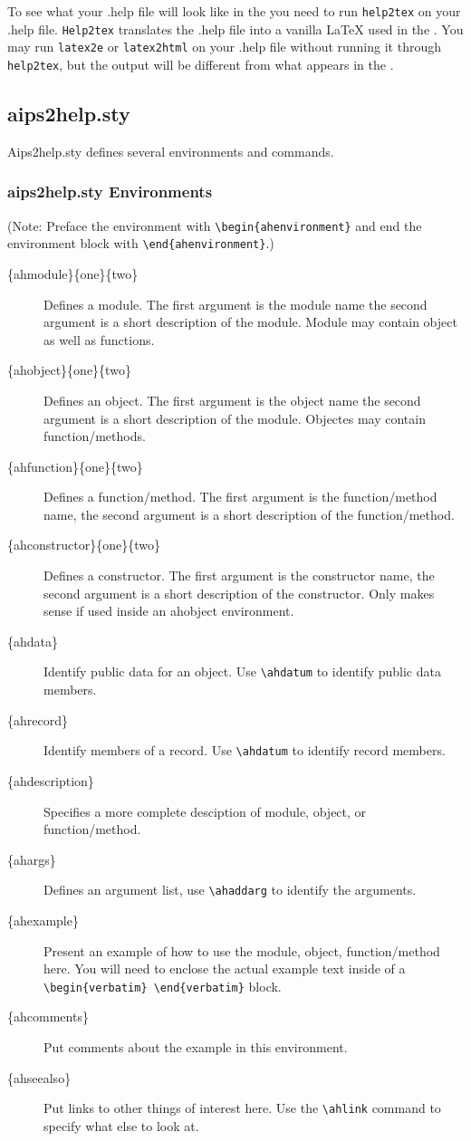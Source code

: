 To see what your .help file will look like in the \userrefman you need to run 
\texttt{help2tex} on your .help file.  \texttt{Help2tex} translates the .help
file into
a vanilla LaTeX used in the \userrefman.
You may run \texttt{latex2e} or \texttt{latex2html} on your .help file
without running it 
through \texttt{help2tex}, but the output will be 
different from what appears in the \userrefman.

\subsection{aips2help.sty\label{197:aips2help}}
Aips2help.sty defines several environments and commands.
\subsubsection{aips2help.sty Environments}
(Note: Preface the environment with
\verb!\begin{ahenvironment}!  and end the environment block with 
\verb!\end{ahenvironment}!.)
\begin{description}
\item[\{ahmodule\}\{one\}\{two\}] Defines a module. The first argument
is the module name the second argument is a short description of the module.
Module may contain object as well as functions.
\item[\{ahobject\}\{one\}\{two\}] Defines an object. The first argument
is the object name the second argument is a short description of the
module.  Objectes may contain function/methods.
\item[\{ahfunction\}\{one\}\{two\}] Defines a function/method. The first
argument is the function/method name, the second argument is a short
description of the function/method.
\item[\{ahconstructor\}\{one\}\{two\}] Defines a constructor.  The first
argument is the constructor name, the second argument is a short description
of the constructor.  Only makes sense if used inside an ahobject environment.
\item[\{ahdata\}]Identify public data for an object. Use \verb!\ahdatum! to
identify public data members.
\item[\{ahrecord\}]Identify members of a record.  Use \verb!\ahdatum! to
identify record members.
\item[\{ahdescription\}] Specifies a more complete desciption of module,
object, or function/method.
\item[\{ahargs\}] Defines an argument list, use \verb!\ahaddarg! to identify the
arguments.
\item[\{ahexample\}] Present an example of how to use the module, object,
function/method here.  You will need to enclose the actual example text
inside of a \verb!\begin{verbatim} \end{verbatim}! block.
\item[\{ahcomments\}] Put comments about the example in this environment.
\item[\{ahseealso\}] Put links to other things of interest here.  Use the
\verb!\ahlink! command to specify what else to look at.
\end{description}

